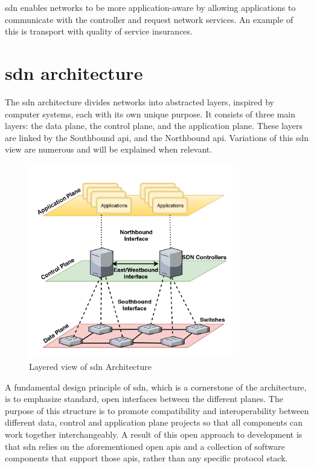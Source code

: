 \gls{sdn} enables networks to be more application-aware by allowing applications to communicate with the controller and request network services\cite{thyagaturu_software_2016}. An example of this is transport with quality of service insurances. 


\section[SDN architecture]{\gls{sdn} architecture} %
\label{sec:sdn_arch}

The \gls{sdn} architecture divides networks into abstracted layers, inspired by computer systems, each with its own unique purpose\cite{kreutz_software-defined_2015}. It consists of three main layers: the data plane, the control plane, and the application plane. These layers are linked by the Southbound \gls{api}, and the Northbound \gls{api}. Variations of this \gls{sdn} view are numerous and will be explained when relevant.

\begin{figure}
	\centering
	\includegraphics[width=0.8\textwidth]{Chapters/Figures/SDNs/LAYERS.png}
	\caption{Layered view of \gls{sdn} Architecture\cite{latif_comprehensive_2020}}
	\label{fig:sdn_layers}
\end{figure}

A fundamental design principle of \gls{sdn}, which is a cornerstone of the architecture, is to emphasize standard, open interfaces between the different planes. The purpose of this structure is to promote compatibility and interoperability between different data, control and application plane projects so that all components can work together interchangeably\cite{kreutz_software-defined_2015}. A result of this open approach to development is that \gls{sdn} relies on the aforementioned open \glspl{api} and a collection of software components that support those \glspl{api}, rather than any specific protocol stack\cite{peterson_software-defined_2021}. 

